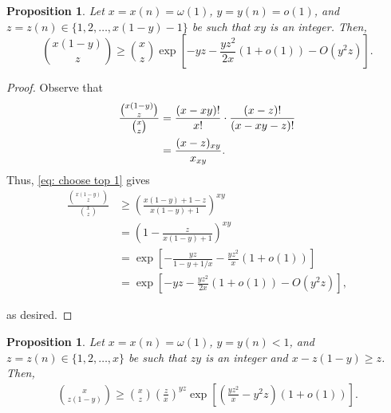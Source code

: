 \documentclass[11pt]{article}
\theoremstyle{plain}
\newtheorem{prop}[thm]{Proposition}
\begin{document}
\begin{prop}\label{prop: choose top}
Let $x = x(n) = \omega(1)$, $y = y(n) = o(1)$, and $z = z(n) \in \{1, 2, \ldots, x(1-y) - 1\}$ be such that $xy$ is an integer. Then,
    \begin{equation*}
         \binom{x(1 - y)}{z} \geq \binom{x}{z}\exp\left[-yz - \frac{yz^2}{2x}(1 + o(1))- O(y^2z)\right].
    \end{equation*}
\end{prop}
\begin{proof}
    Observe that 
    \begin{align}
        \frac{\binom{x(1-y)}{z}}{\binom{x}{z}}&= \frac{(x - xy)!}{x!} \cdot \frac{(x - z)!}{(x - xy - z)!}\notag\\
        &= \frac{(x - z)_{xy}}{x_{xy}}. \label{eq: choose top 1}
        \end{align}
         Thus, \eqref{eq: choose top 1} gives 
         \begin{align*}
             \frac{\binom{x(1-y)}{z}}{\binom{x}{z}}  &\geq \left(\frac{x(1 - y) + 1 - z}{x(1 - y) + 1}\right)^{xy} \\
             &= \left(1 - \frac{z}{x(1 - y) + 1}\right)^{xy}\\
             &= \exp\left[-\frac{yz}{1 - y + 1/x} - \frac{yz^2}{x} (1 + o(1))\right]\\
             &= \exp\left[-yz - \frac{yz^2}{2x}(1 + o(1))- O(y^2z)\right],
         \end{align*}
        
    as desired.
\end{proof}
\begin{prop}\label{prop: choose bot}
    Let $x = x(n) = \omega(1)$, $y = y(n) < 1$, and $z = z(n) \in \{1, 2, \ldots, x\}$ be such that $zy$ is an integer and $x - z(1 - y) \geq z$. Then,
    \begin{align*}
        \binom{x}{z(1 - y)} \geq\binom{x}{z}\left(\frac{z}{x}\right)^{yz}\exp\left[\left( \frac{yz^2}{x}- y^2z\right)(1 + o(1))\right].
    \end{align*}
        
\end{prop}
\end{document}
